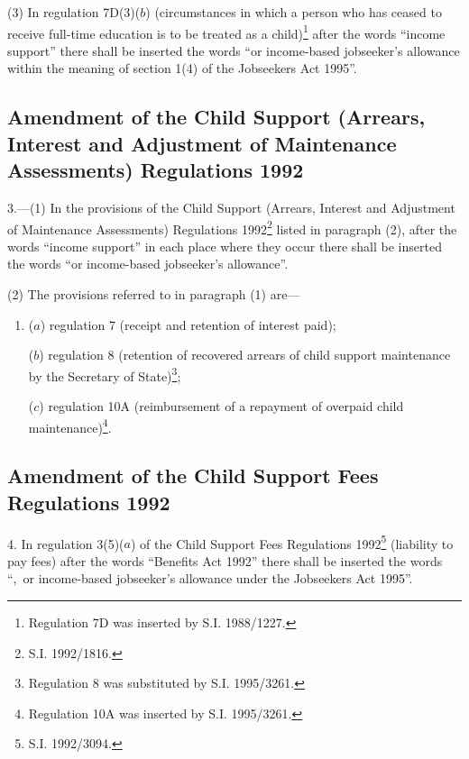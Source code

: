 \documentclass[a4paper]{article}
\begin{document}
(3) In regulation 7D(3)($b$) (circumstances in which a person who has ceased to receive full-time education is to be treated as a child)\footnote{\frenchspacing Regulation 7D was inserted by S.I. 1988/1227.} after the words “income support” there shall be inserted the words “or income-based jobseeker’s allowance within the meaning of section 1(4) of the Jobseekers Act 1995”.

\subsection[3. Amendment of the Child Support (Arrears, Interest and Adjustment of Maintenance Assessments) Regulations 1992]{Amendment of the Child Support (Arrears, Interest and Adjustment of Maintenance Assessments) Regulations 1992}

3.—(1) In the provisions of the Child Support (Arrears, Interest and Adjustment of Maintenance Assessments) Regulations 1992\footnote{\frenchspacing S.I. 1992/1816.} listed in paragraph (2), after the words “income support” in each place where they occur there shall be inserted the words “or income-based jobseeker’s allowance”.

(2) The provisions referred to in paragraph (1) are—
\begin{enumerate}\item[]
($a$) regulation 7 (receipt and retention of interest paid);

($b$) regulation 8 (retention of recovered arrears of child support maintenance by the Secretary of State)\footnote{\frenchspacing Regulation 8 was substituted by S.I. 1995/3261.};

($c$) regulation 10A (reimbursement of a repayment of overpaid child maintenance)\footnote{\frenchspacing Regulation 10A was inserted by S.I. 1995/3261.}.
\end{enumerate}

\subsection[4. Amendment of the Child Support Fees Regulations 1992]{Amendment of the Child Support Fees Regulations 1992}

4.  In regulation 3(5)($a$) of the Child Support Fees Regulations 1992\footnote{\frenchspacing S.I. 1992/3094.} (liability to pay fees) after the words “Benefits Act 1992” there shall be inserted the words “,~or income-based jobseeker’s allowance under the Jobseekers Act 1995”.
\end{document}
